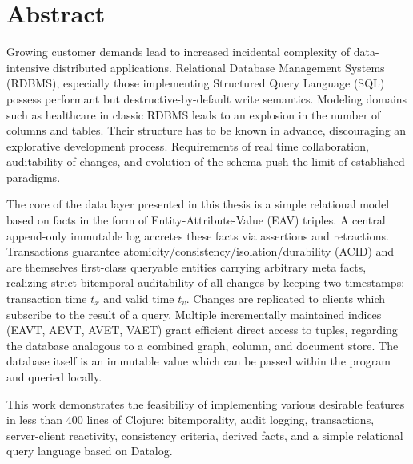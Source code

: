 \cleardoublepage{}

\section*{Abstract}

Growing customer demands lead to increased incidental complexity of data-intensive distributed applications. Relational Database Management Systems (RDBMS), especially those implementing Structured Query Language (SQL) possess performant but destructive-by-default write semantics. Modeling domains such as healthcare in classic RDBMS leads to an explosion in the number of columns and tables. Their structure has to be known in advance, discouraging an explorative development process. Requirements of real time collaboration, auditability of changes, and evolution of the schema push the limit of established paradigms.

The core of the data layer presented in this thesis is a simple relational model based on facts in the form of Entity-Attribute-Value (EAV) triples. A central append-only immutable log accretes these facts via assertions and retractions. Transactions guarantee atomicity/consistency/isolation/durability (ACID) and are themselves first-class queryable entities carrying arbitrary meta facts, realizing strict bitemporal auditability of all changes by keeping two timestamps: transaction time $t_x$ and valid time $t_v$. Changes are replicated to clients which subscribe to the result of a query. Multiple incrementally maintained indices (EAVT, AEVT, AVET, VAET) grant efficient direct access to tuples, regarding the database analogous to a combined graph, column, and document store. The database itself is an immutable value which can be passed within the program and queried locally.

This work demonstrates the feasibility of implementing various desirable features in less than 400 lines of Clojure: bitemporality, audit logging, transactions, server-client reactivity, consistency criteria, derived facts, and a simple relational query language based on Datalog.
